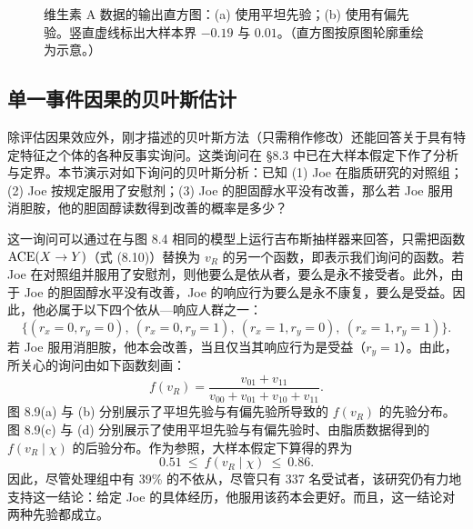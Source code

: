 \begin{figure}[htbp]
\centering
{}
\caption{维生素 A 数据的输出直方图：(a) 使用平坦先验；(b) 使用有偏先验。竖直虚线标出大样本界 $-0.19$ 与 $0.01$。（直方图按原图轮廓重绘为示意。）}
\label{fig:8.8}
\end{figure}

\subsection{单一事件因果的贝叶斯估计}

除评估因果效应外，刚才描述的贝叶斯方法（只需稍作修改）还能回答关于具有特定特征之个体的各种反事实询问。这类询问在 \S 8.3 中已在大样本假定下作了分析与定界。本节演示对如下询问的贝叶斯分析：已知 (1) Joe 在脂质研究的对照组；(2) Joe 按规定服用了安慰剂；(3) Joe 的胆固醇水平没有改善，那么若 Joe 服用消胆胺，他的胆固醇读数得到改善的概率是多少？

这一询问可以通过在与图 8.4 相同的模型上运行吉布斯抽样器来回答，只需把函数 $\mathrm{ACE}(X\to Y)$（式 \textup{(8.10)}）替换为 $v_R$ 的另一个函数，即表示我们询问的函数。若 Joe 在对照组并服用了安慰剂，则他要么是依从者，要么是永不接受者。此外，由于 Joe 的胆固醇水平没有改善，Joe 的响应行为要么是永不康复，要么是受益。因此，他必属于以下四个依从—响应人群之一：
\[
\{(r_x=0,r_y=0),\ (r_x=0,r_y=1),\ (r_x=1,r_y=0),\ (r_x=1,r_y=1)\}.
\]
若 Joe 服用消胆胺，他本会改善，当且仅当其响应行为是受益（$r_y=1$）。由此，所关心的询问由如下函数刻画：
\[
f(v_R)=\frac{v_{01}+v_{11}}{v_{00}+v_{01}+v_{10}+v_{11}}.
\]
图 8.9(a) 与 (b) 分别展示了平坦先验与有偏先验所导致的 $f(v_R)$ 的先验分布。图 8.9(c) 与 (d) 分别展示了使用平坦先验与有偏先验时、由脂质数据得到的 $f(v_R\mid\chi)$ 的后验分布。作为参照，大样本假定下算得的界为
\[
0.51\ \le\ f(v_R\mid\chi)\ \le\ 0.86.
\]
因此，尽管处理组中有 39\% 的不依从，尽管只有 337 名受试者，该研究仍有力地支持这一结论：给定 Joe 的具体经历，他服用该药本会更好。而且，这一结论对两种先验都成立。

